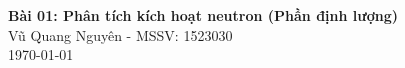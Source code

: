 \documentclass[10pt,a4paper]{extarticle}
\numberwithin{equation}{section}
\numberwithin{figure}{section}
\numberwithin{table}{section}
\begin{document}
\begin{center}
    \Large{\textbf{Bài 01: Phân tích kích hoạt neutron (Phần định lượng)}}\\
    \vspace{1.5em}
    \large{Vũ Quang Nguyên - MSSV: 1523030}\\
      \vspace{0.5em}
    \small{\today}
\end{center}
\setcounter{section}{0}

\end{document}
